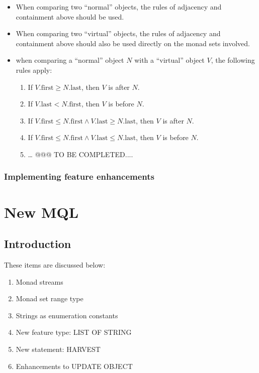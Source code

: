 \documentclass[a4paper,12pt]{article}
\begin{document}
\begin{itemize}
\item When comparing two ``normal'' objects, the rules of adjacency
  and containment above should be used.

\item When comparing two ``virtual'' objects, the rules of adjacency
  and containment above should also be used directly on the monad sets
  involved.

\item when comparing a ``normal'' object $N$ with a ``virtual'' object
  $V$, the following rules apply:

  \begin{enumerate}
    \item If $V.\mathrm{first} \geq N.\mathrm{last}$, then $V$ is after $N$.
    \item If $V.\mathrm{last} < N.\mathrm{first}$, then $V$ is before $N$.
    \item If $V.\mathrm{first} \leq N.\mathrm{first} \wedge V.\mathrm{last} \geq N.\mathrm{last}$, then $V$ is after $N$.
    \item If $V.\mathrm{first} \leq N.\mathrm{first} \wedge V.\mathrm{last} \leq N.\mathrm{last}$, then $V$ is before $N$.
    \item \ldots{} @@@ TO BE COMPLETED....
  \end{enumerate}

\end{itemize}

\subsubsection{Implementing feature enhancements}

\section{New MQL}

\subsection{Introduction}

These items are discussed below:

\begin{enumerate}
\item Monad streams
\item Monad set range type
\item Strings as enumeration constants
\item New feature type: LIST OF STRING
\item New statement: HARVEST
\item Enhancements to UPDATE OBJECT
\end{enumerate}
\end{document}
